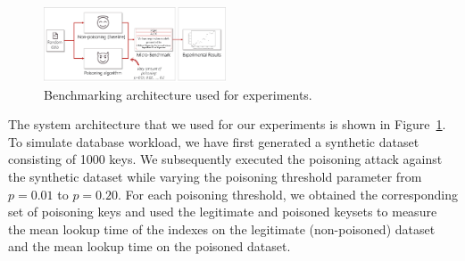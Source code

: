 \documentclass[sigconf]{acmart}
\begin{document}
\begin{figure}[h]
    \centering
      \includegraphics[width=0.48\textwidth]{figures/learned_indexes-data_pipeline.png}
         \vspace{-0.5em}
        \caption{Benchmarking architecture used for experiments.}
        \vspace{-0.5em}
        \label{fig:system-architecture}
\end{figure}
  
The system architecture that we used for our experiments is shown in Figure~\ref{fig:system-architecture}. To simulate database workload, we have first generated a synthetic dataset consisting of 1000 keys. We subsequently executed the poisoning attack against the synthetic dataset while varying the poisoning threshold parameter from $p=0.01$ to $p=0.20$. For each poisoning threshold, we obtained the corresponding set of poisoning keys and used the legitimate and poisoned keysets to measure the mean lookup time of the indexes on the legitimate (non-poisoned) dataset and the mean lookup time on the poisoned dataset.
\end{document}
